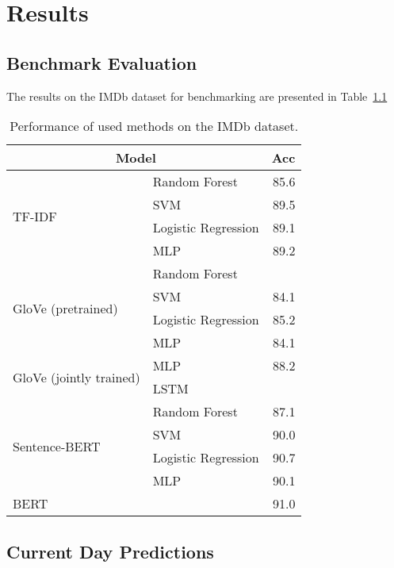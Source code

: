 \chapter{Results}

\section{Benchmark Evaluation}

The results on the IMDb dataset for benchmarking are presented in Table~\ref{tab:imdb}


\begin{table}[h]
    \centering
    \begin{tabular}{llr}
    \hline
        \multicolumn{2}{c}{\textbf{Model}} & \textbf{Acc} \\
        \hline \hline   
        \multirow{4}{*}{TF-IDF} & Random Forest & 85.6 \\
        & SVM & 89.5 \\
        & Logistic Regression & 89.1 \\
        & MLP & 89.2 \\
        \hline 
        \multirow{4}{*}{GloVe (pretrained)} & Random Forest & \\
        & SVM & 84.1 \\
        & Logistic Regression & 85.2 \\
        & MLP & 84.1 \\
        \hline 
        \multirow{2}{*}{GloVe (jointly trained)} & MLP & 88.2 \\
        & LSTM & \\
        \hline 
        \multirow{4}{*}{Sentence-BERT} & Random Forest & 87.1 \\
        & SVM & 90.0 \\
        & Logistic Regression & 90.7 \\
        & MLP & 90.1 \\
        \hline
        BERT & & 91.0  \\
        \hline
    \end{tabular}
\caption{Performance of used methods on the IMDb dataset.}
\label{tab:imdb}
\end{table}


\section{Current Day Predictions}

